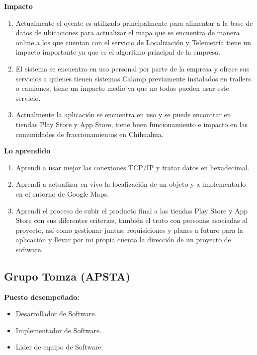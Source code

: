 \documentclass[protocolo.tex]{subfiles}
\begin{document}
\textbf{Impacto}
\begin{enumerate}
\item Actualmente el oyente es utilizado principalmente para alimentar a la base de datos de
ubicaciones para actualizar el mapa que se encuentra de manera online a los que cuentan
con el servicio de Localización y Telemetría tiene un impacto importante ya que es el
algoritmo principal de la empresa.

\item El sistema se encuentra en uso personal por parte de la empresa y ofrece sus servicios a
quienes tienen sistemas Calamp previamente instalados en trailers o camiones, tiene un
impacto medio ya que no todos pueden usar este servicio.

\item Actualmente la aplicación se encuentra en uso y se puede encontrar en tiendas Play
Store y App Store, tiene buen funcionamiento e impacto en las comunidades de
fraccionamientos en Chihuahua.

\end{enumerate}

\textbf{Lo aprendido}
\begin{enumerate}
\item Aprendí a usar mejor las conexiones TCP/IP y tratar datos en hexadecimal.

\item Aprendí a actualizar en vivo la localización de un objeto y a implementarlo en el
entorno de Google Maps.

\item Aprendí el proceso de subir el producto final a las tiendas Play Store y App Store con
sus diferentes criterios, también el trato con personas asociadas al proyecto, así como
gestionar juntas, requisiciones y planes a futuro para la aplicación y llevar por mi propia
cuenta la dirección de un proyecto de software.

\end{enumerate}
\vfill %
\subsection{Grupo Tomza (APSTA)}

\textbf{Puesto desempeñado:} 
\begin{itemize}
\item Desarrollador de Software.
\item Implementador de Software.
\item Lider de equipo de Software.

\end{itemize}
\end{document}
